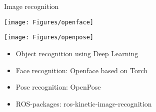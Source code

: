 \documentclass[12pt,a4paper]{article}
\newcommand{\emptylogo}{\texttt{[image: Figures/Empty]}}
\begin{document}
\begin{slidetop}
\begin{multicols}{2}
\vspace{-0.8cm} %

\begin{bclogo}[couleur = white, arrondi = 0.25, couleurBord = tuedarkblue , barre = none, logo=\emptylogo]{\textcolor{tuedarkblue}{Image recognition}}
\medskip %
\begin{minipage}[T]{0.48\linewidth}
	\begin{center}
		\texttt{[image: Figures/openface]}
	\end{center}
\end{minipage}
\hfill
\begin{minipage}[T]{0.48\linewidth}
    \begin{center}
    	\texttt{[image: Figures/openpose]}
    \end{center}
\end{minipage}
\begin{itemize}[itemsep = 0pt, parsep = 0pt, leftmargin=15pt]
	\item Object recognition using Deep Learning
	\item Face recognition: Openface based on Torch
    \item Pose recognition: OpenPose
    \item ROS-packages: ros-kinetic-image-recognition
\end{itemize}
\end{bclogo}

\vfill
\columnbreak


\end{multicols}
\end{slidetop}
\end{document}
